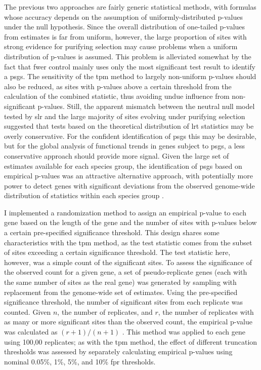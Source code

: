 The previous two approaches are fairly generic statistical methods,
with formulas whose accuracy depends on the assumption of
uniformly-distributed p-values under the null hypothesis. Since the
overall distribution of one-tailed p-values from \sw estimates is far
from uniform, however, the large proportion of sites with strong
evidence for purifying selection may cause problems when a uniform
distribution of p-values is assumed. This problem is alleviated
somewhat by the fact that \ac{fwer} control mainly uses only the most
significant test result to identify a \acp{psg}. The sensitivity of
the \ac{tpm} method to largely non-uniform p-values should also be
reduced, as sites with p-values above a certain threshold from the
calculation of the combined statistic, thus avoiding undue influence
from non-significant p-values. Still, the apparent mismatch between
the neutral null model tested by \ac{slr} and the large majority of
sites evolving under purifying selection suggested that tests based on
the theoretical distribution of \ac{lrt} statistics may be overly
conservative. For the confident identification of \acp{psg} this may
be desirable, but for the global analysis of functional trends in
genes subject to \acp{psg}, a less conservative approach should
provide more signal. Given the large set of \sw estimates available
for each species group, the identification of \acp{psg} based on
empirical p-values was an attractive alternative approach, with
potentially more power to detect genes with significant deviations
from the observed genome-wide distribution of \slrt statistics within
each species group \citep{Noble2009a}.

I implemented a randomization method to assign an empirical p-value to
each gene based on the length of the gene and the number of sites with
p-values below a certain pre-specified significance threshold. This
design shares some characteristics with the \ac{tpm} method, as the
test statistic comes from the subset of sites exceeding a certain
significance threshold. The test statistic here, however, was a simple
count of the significant sites. To assess the significance of the
observed count for a given gene, a set of pseudo-replicate genes (each
with the same number of sites as the real gene) was generated by
sampling with replacement from the genome-wide set of \sw
estimates. Using the pre-specified significance threshold, the number
of significant sites from each replicate was counted. Given $n$, the
number of replicates, and $r$, the number of replicates with as many
or more significant sites than the observed count, the empirical
p-value was calculated as $(r+1) / (n+1)$ \citep{North2002}. This
method was applied to each gene using 100,00 replicates; as with the
\ac{tpm} method, the effect of different truncation thresholds was
assessed by separately calculating empirical p-values using nominal
0.05\%, 1\%, 5\%, and 10\% \ac{fpr} thresholds.


